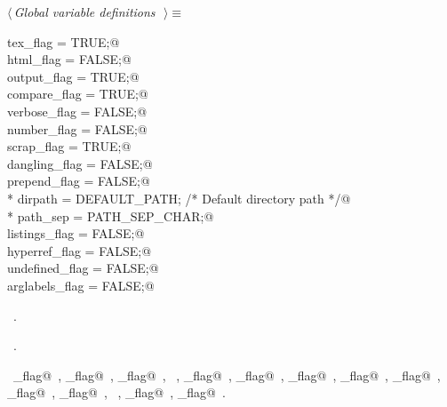 \documentclass{report}
\begin{document}
\begin{flushleft} \small
\begin{minipage}{\linewidth} \label{scrap17}
$\langle\,${\it Global variable definitions}\nobreak\ {\footnotesize {}}$\,\rangle\equiv$
\vspace{-1ex}
\begin{list}{}{} \item
\mbox{}\verb@int tex_flag = TRUE;@\\
\mbox{}\verb@int html_flag = FALSE;@\\
\mbox{}\verb@int output_flag = TRUE;@\\
\mbox{}\verb@int compare_flag = TRUE;@\\
\mbox{}\verb@int verbose_flag = FALSE;@\\
\mbox{}\verb@int number_flag = FALSE;@\\
\mbox{}\verb@int scrap_flag = TRUE;@\\
\mbox{}\verb@int dangling_flag = FALSE;@\\
\mbox{}\verb@int prepend_flag = FALSE;@\\
\mbox{}\verb@char * dirpath = DEFAULT_PATH; /* Default directory path */@\\
\mbox{}\verb@char * path_sep = PATH_SEP_CHAR;@\\
\mbox{}\verb@int listings_flag = FALSE;@\\
\mbox{}\verb@int hyperref_flag = FALSE;@\\
\mbox{}\verb@int undefined_flag = FALSE;@\\
\mbox{}\verb@int arglabels_flag = FALSE;@\\
\mbox{}\verb@@{\NWsep}
\end{list}
\vspace{-1ex}
\footnotesize\addtolength{\baselineskip}{-1ex}
\begin{list}{}{\setlength{\itemsep}{-\parsep}\setlength{\itemindent}{-\leftmargin}}
\item \NWtxtMacroDefBy\ .
\item \NWtxtMacroRefIn\ .
\end{list}
\vspace{-2ex}
\footnotesize\addtolength{\baselineskip}{-1ex}
\begin{list}{}{\setlength{\itemsep}{-\parsep}\setlength{\itemindent}{-\leftmargin}}
\item \NWtxtIdentsUsed\nobreak\  \verb@arglabels_flag@\nobreak\ , \verb@compare_flag@\nobreak\ , \verb@dangling_flag@\nobreak\ , \verb@FALSE@\nobreak\ , \verb@html_flag@\nobreak\ , \verb@hyperref_flag@\nobreak\ , \verb@listings_flag@\nobreak\ , \verb@number_flag@\nobreak\ , \verb@output_flag@\nobreak\ , \verb@scrap_flag@\nobreak\ , \verb@tex_flag@\nobreak\ , \verb@TRUE@\nobreak\ , \verb@undefined_flag@\nobreak\ , \verb@verbose_flag@\nobreak\ .\end{list}

\end{minipage}
\end{flushleft}
\end{document}
